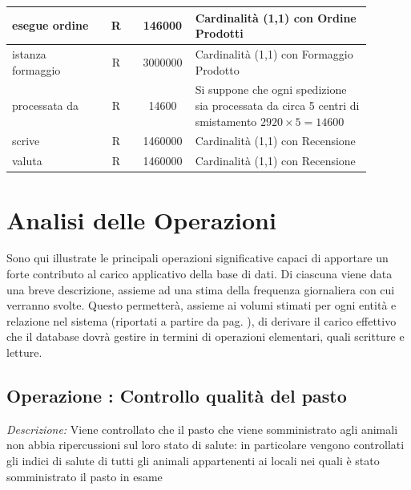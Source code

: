 \documentclass[12pt,a4paper]{article}
\begin{document}
\begin{center}
\begin{longtable}{|p{0.23\linewidth}|p{0.1\linewidth}|p{0.11\linewidth}|p{0.45\linewidth}|}
\hline
esegue ordine
 & 
\multicolumn{1}{|c|}{R}
 & 
\multicolumn{1}{|c|}{146000}
 & 
Cardinalità (1,1) con Ordine Prodotti
\\

\hline
istanza formaggio
 & 
\multicolumn{1}{|c|}{R}
 & 
\multicolumn{1}{|c|}{3000000}
 & 
Cardinalità (1,1) con Formaggio Prodotto
\\

\hline
processata da
 & 
\multicolumn{1}{|c|}{R}
 & 
\multicolumn{1}{|c|}{14600}
 & 
Si suppone che ogni spedizione sia processata da circa 5 centri di smistamento $2920\times 5=14600$
\\

\hline
scrive
 & 
\multicolumn{1}{|c|}{R}
 & 
\multicolumn{1}{|c|}{1460000}
 & 
Cardinalità (1,1) con Recensione
\\

\hline
valuta
 & 
\multicolumn{1}{|c|}{R}
 & 
\multicolumn{1}{|c|}{1460000}
 & 
\vspace{-25pt}Cardinalità (1,1) con Recensione
\\

\hline

\end{longtable}\end{center}

\newpage
\section{Analisi delle Operazioni}
\label{sec:operazioni}
Sono qui illustrate le principali operazioni significative capaci di apportare un forte contributo al carico applicativo della base di dati.
Di ciascuna viene data una breve descrizione, assieme ad una stima della frequenza giornaliera con cui verranno svolte.
Questo permetterà, assieme ai volumi stimati per ogni entità e relazione nel sistema (riportati a partire da pag. \pageref{sec:volumi}), di derivare il carico effettivo che il database dovrà gestire in termini di operazioni elementari, quali scritture e letture.











\subsection*{Operazione \thecounterAccessi{}: Controllo qualità del pasto}
\noindent\textit{Descrizione:} Viene controllato che il pasto che viene somministrato agli animali non abbia ripercussioni sul loro stato di salute: in particolare vengono controllati gli indici di salute di tutti gli animali appartenenti ai locali nei quali è stato somministrato il pasto in esame
\end{document}
